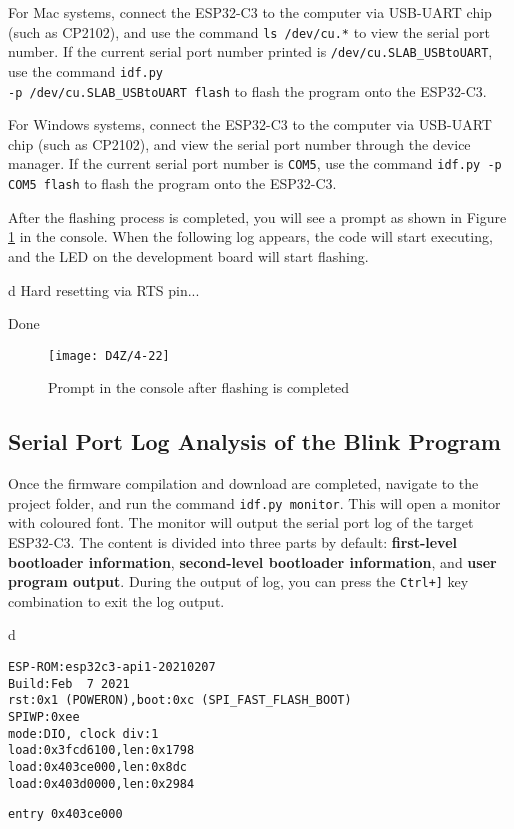 \documentclass[a4paper,12pt]{book}
\begin{document}
For Mac systems, connect the ESP32-C3 to the computer via USB-UART chip (such as CP2102), and use the command \verb|ls /dev/cu.*| to view the serial port number. If the current serial port number printed is \verb|/dev/cu.SLAB_USBtoUART|, use the command \verb|idf.py |\\ \verb|-p /dev/cu.SLAB_USBtoUART flash| to flash the program onto the ESP32-C3.

For Windows systems, connect the ESP32-C3 to the computer via USB-UART chip (such as CP2102), and view the serial port number through the device manager. If the current serial port number is \verb|COM5|, use the command \verb|idf.py -p COM5 flash| to flash the program onto the ESP32-C3.

After the flashing process is completed, you will see a prompt as shown in Figure \ref{Prompt in the console after flashing is completed} in the console. When the following log appears, the code will start executing, and the LED on the development board will start flashing.

\begin{codebloc}
\begin{tabular}{d}
Hard resetting via RTS pin...

Done
\end{tabular}
\end{codebloc}

\begin{figure}[h!]
    \Centering
    \texttt{[image: D4Z/4-22]}
    \caption{Prompt in the console after flashing is completed}
    \label{Prompt in the console after flashing is completed}
\end{figure}

\subsection{Serial Port Log Analysis of the Blink Program}
Once the firmware compilation and download are completed, navigate to the project folder, and run the command \verb|idf.py monitor|. This will open a monitor with coloured font. The monitor will output the serial port log of the target ESP32-C3. The content is divided into three parts by default: \textbf{first-level bootloader information}, \textbf{second-level bootloader information}, and \textbf{user program output}. During the output of log, you can press the \verb|Ctrl+]| key combination to exit the log output.

\begin{codebloc}
\begin{tabular}{d}
\vspace{2pt}
\begin{verbatim}
ESP-ROM:esp32c3-api1-20210207
Build:Feb  7 2021
rst:0x1 (POWERON),boot:0xc (SPI_FAST_FLASH_BOOT)
SPIWP:0xee
mode:DIO, clock div:1
load:0x3fcd6100,len:0x1798
load:0x403ce000,len:0x8dc
load:0x403d0000,len:0x2984
\end{verbatim}
\verb|entry 0x403ce000|
\end{tabular}
\end{codebloc}
\end{document}
